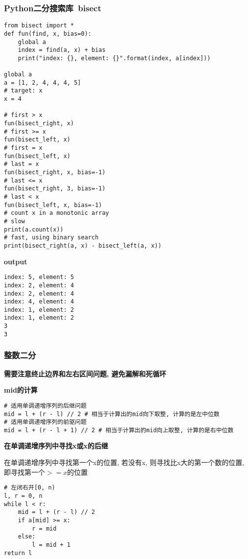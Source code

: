 \documentclass[../main]{subfiles}
\begin{document}
\begin{sloppy}
\subsubsection{Python二分搜索库\ bisect}

\begin{lstlisting}[style = Python]
from bisect import *
def fun(find, x, bias=0):
    global a
    index = find(a, x) + bias
    print("index: {}, element: {}".format(index, a[index]))

global a
a = [1, 2, 4, 4, 4, 5]
# target: x
x = 4

# first > x
fun(bisect_right, x)
# first >= x
fun(bisect_left, x)
# first = x
fun(bisect_left, x)
# last = x
fun(bisect_right, x, bias=-1)
# last <= x
fun(bisect_right, 3, bias=-1)
# last < x
fun(bisect_left, x, bias=-1)
# count x in a monotonic array
# slow
print(a.count(x))
# fast, using binary search
print(bisect_right(a, x) - bisect_left(a, x))
\end{lstlisting}

\textbf{output}

\begin{lstlisting}[style = Pseudocode]
index: 5, element: 5
index: 2, element: 4
index: 2, element: 4
index: 4, element: 4
index: 1, element: 2
index: 1, element: 2
3
3
\end{lstlisting}

\subsubsection{整数二分}

\textbf{需要注意终止边界和左右区间问题, 避免漏解和死循环}

\indent\par

\textbf{mid的计算}

\begin{lstlisting}[style = Python]
# 适用单调递增序列的后继问题
mid = l + (r - l) // 2 # 相当于计算出的mid向下取整, 计算的是左中位数
# 适用单调递增序列的前驱问题
mid = l + (r - l + 1) // 2 # 相当于计算出的mid向上取整, 计算的是右中位数
\end{lstlisting}

\newpage

\textbf{在单调递增序列中寻找x或x的后继}

在单调递增序列中寻找第一个x的位置, 若没有x, 则寻找比x大的第一个数的位置, 即寻找第一个$
>= x$的位置

\begin{lstlisting}[style = Python]
# 左闭右开[0, n)
l, r = 0, n
while l < r:
    mid = l + (r - l) // 2
    if a[mid] >= x:
        r = mid
    else:
        l = mid + 1
return l
\end{lstlisting}


\end{sloppy}
\end{document}
